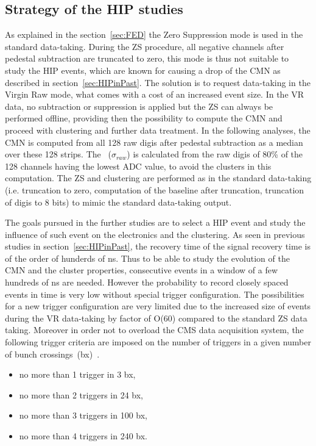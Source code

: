 \subsection{Strategy of the HIP studies~\label{sec:strategy}}

As explained in the section~\ref{sec:FED} the Zero Suppression mode is used in the standard data-taking. During the ZS procedure, all negative channels after pedestal subtraction are truncated to zero, this mode is thus not suitable to study the HIP events, which are known for causing a drop of the CMN as described in section~\ref{sec:HIPinPast}. The solution is to request data-taking in the Virgin Raw mode, what comes with a cost of an increased event size. In the VR data, no subtraction or suppression is applied but the ZS can always be performed offline, providing then the possibility to compute the CMN and proceed with clustering and further data treatment. In the following analyses, the CMN is computed from all 128 raw digis after pedestal subtraction as a median over these 128 strips. The \SD~($\sigma_{raw}$) is calculated from the raw digis of 80\% of the 128 channels having the lowest ADC value, to avoid the clusters in this computation. The ZS and clustering are performed as in the standard data-taking (i.e. truncation to zero, computation of the baseline after truncation, truncation of digis to 8 bits) to mimic the standard data-taking output.

The goals pursued in the further studies are to select a HIP event and study the influence of such event on the electronics and the clustering. As seen in previous studies in section~\ref{sec:HIPinPast}, the recovery time of the signal recovery time is of the order of hunderds of ns. Thus to be able to study the evolution of the CMN and the cluster properties, consecutive events in a window of a few hundreds of ns are needed. However the probability to record closely spaced events in time is very low without special trigger configuration. The possibilities for a new trigger configuration are very limited due to the increased size of events during the VR data-taking by factor of O(60) compared to the standard ZS data taking. Moreover in order not to overload the CMS data acquisition system, the following trigger criteria are imposed on the number of triggers in a given number of bunch crossings~(bx)~\cite{website:VRtrigger}.

\begin{itemize}
\item{no more than 1 trigger in 3 bx,}
\item{no more than 2 triggers in 24 bx,}
\item{no more than 3 triggers in 100 bx,}
\item{no more than 4 triggers in 240 bx.}
\end{itemize}

